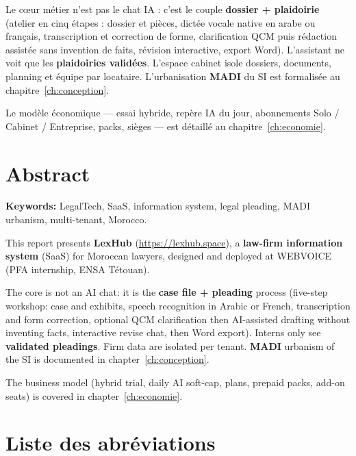 Le cœur métier n'est pas le chat IA : c'est le couple \textbf{dossier + plaidoirie} (atelier en cinq étapes : dossier et pièces, dictée vocale native en arabe ou français, transcription et correction de forme, clarification QCM puis rédaction assistée sans invention de faits, révision interactive, export Word). L'assistant ne voit que les \textbf{plaidoiries validées}. L'espace cabinet isole dossiers, documents, planning et équipe par locataire. L'urbanisation \textbf{MADI} du SI est formalisée au chapitre~\ref{ch:conception}.

Le modèle économique --- essai hybride, repère IA du jour, abonnements Solo / Cabinet / Entreprise, packs, sièges --- est détaillé au chapitre~\ref{ch:economie}.

\chapter*{Abstract}

\textbf{Keywords:} LegalTech, SaaS, information system, legal pleading, MADI urbanism, multi-tenant, Morocco.

This report presents \textbf{LexHub} (\url{https://lexhub.space}), a \textbf{law-firm information system} (SaaS) for Moroccan lawyers, designed and deployed at WEBVOICE (PFA internship, ENSA Tétouan).

The core is not an AI chat: it is the \textbf{case file + pleading} process (five-step workshop: case and exhibits, speech recognition in Arabic or French, transcription and form correction, optional QCM clarification then AI-assisted drafting without inventing facts, interactive revise chat, then Word export). Interns only see \textbf{validated pleadings}. Firm data are isolated per tenant. \textbf{MADI} urbanism of the SI is documented in chapter~\ref{ch:conception}.

The business model (hybrid trial, daily AI soft-cap, plans, prepaid packs, add-on seats) is covered in chapter~\ref{ch:economie}.

\chapter*{Liste des abréviations}

